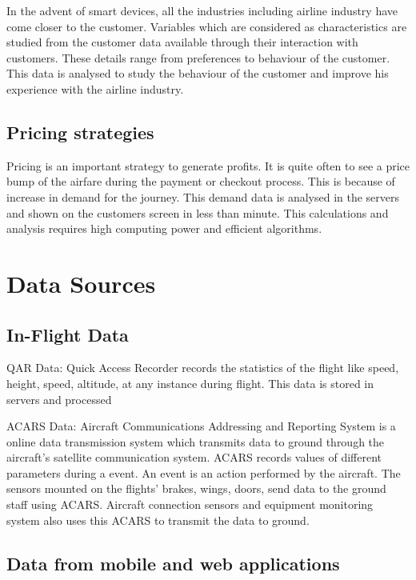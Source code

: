 \documentclass[sigconf]{acmart}
\begin{document}
In the advent of smart devices, all the industries including airline industry have come closer to the customer. Variables which are considered as characteristics are studied from the customer data available through their interaction with customers. These details range from preferences to behaviour of the customer. This data is analysed to study the behaviour of the customer and improve his experience with the airline industry. 

\subsection{Pricing strategies}

Pricing is an important strategy to generate profits. It is quite often to see a price bump of the airfare during the payment or checkout process. This is because of increase in demand for the journey. This demand data is analysed in the servers and shown on the customers screen in less than minute. This calculations and analysis requires high computing power and efficient algorithms. 


\section{Data Sources}

\subsection{In-Flight Data}

QAR Data: Quick Access Recorder records the statistics of the flight like speed, height, speed, altitude, at any instance during flight. This data is stored in servers and processed 

ACARS Data: Aircraft Communications Addressing and Reporting System is a online data transmission system which transmits data to ground through the aircraft’s satellite communication system. ACARS records values of different parameters during a event. An event is an action performed by the aircraft. The sensors mounted on the flights’ brakes, wings, doors, send data to the ground staff using ACARS. Aircraft connection sensors and equipment monitoring system also uses this ACARS to transmit the data to ground.

\subsection{Data from mobile and web applications}
\end{document}
